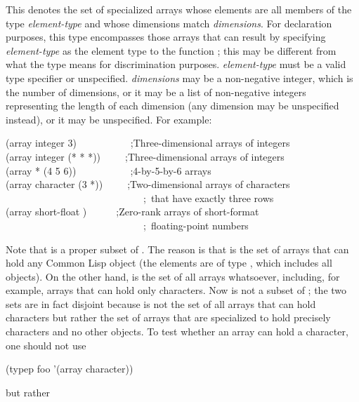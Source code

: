 \begin{flushdesc}
\item[\cd{(array \emph{element-type} \emph{dimensions})}]
This denotes the set
of specialized arrays
whose elements are all members of the type \emph{element-type}
and whose dimensions match \emph{dimensions}.
For declaration purposes, this type encompasses those arrays
that can result by specifying \emph{element-type} as the element type
to the function ; this may be different
from what the type means for discrimination purposes.
\emph{element-type} must be a valid type specifier or unspecified.
\emph{dimensions} may be a non-negative integer, which is the number
of dimensions, or it may be a list of non-negative integers
representing the length of each dimension (any dimension
may be unspecified instead), or it may be unspecified.
For example:
\begin{lisp}
(array integer 3)~~~~~~~~~~~;\textrm{Three-dimensional arrays of integers} \\
(array integer (* * *))~~~~~;\textrm{Three-dimensional arrays of integers} \\
(array * (4 5 6))~~~~~~~~~~~;\textrm{4-by-5-by-6 arrays} \\
(array character (3 *))~~~~~;\textrm{Two-dimensional arrays of characters} \\
~~~~~~~~~~~~~~~~~~~~~~~~~~~~;~\textrm{that have exactly three rows} \\
(array short-float {\emptylist})~~~~~~;\textrm{Zero-rank arrays of short-format} \\
~~~~~~~~~~~~~~~~~~~~~~~~~~~~;~\textrm{floating-point numbers}
\end{lisp}
Note that  is a proper subset of .
The reason is that  is the set of arrays that can
hold any Common Lisp object (the elements are of type ,
which includes all objects).  On the other hand, 
is the set of all arrays whatsoever, including, for example,
arrays that can hold only characters.  Now
 is not a subset of ; the two sets
are in fact disjoint because  is not the
set of all arrays that can hold characters but rather the set of
arrays that are specialized to hold precisely characters and no
other objects.  To test whether an array  can hold a character,
one should not use
\begin{lisp}
(typep foo '(array character))
\end{lisp}
but rather
\begin{lisp}

\end{lisp}
\end{flushdesc}
